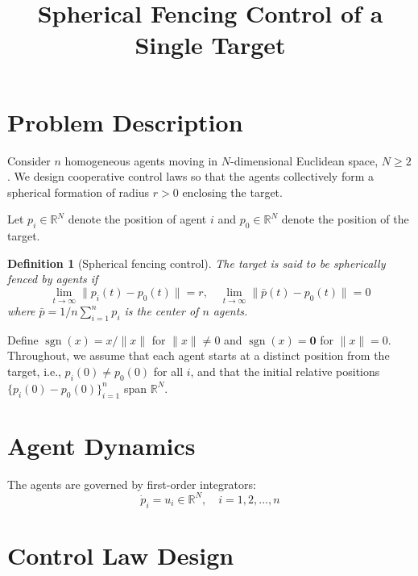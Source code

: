 \documentclass{ctexart}
\title{Spherical Fencing Control of a Single Target}
\DeclareMathOperator{\sgn}{sgn}
\newtheorem{definition}[theorem]{Definition}
\begin{document}
\maketitle

\section{Problem Description}

Consider $n$ homogeneous agents moving in $N$-dimensional Euclidean space, $N \geq 2$.
We design cooperative control laws so that the agents collectively form a spherical formation of radius $r > 0$ enclosing the target.

Let $p_i \in \mathbb{R}^N$ denote the position of agent $i$ and $p_0 \in \mathbb{R}^N$ denote the position of the target.
\begin{definition}[Spherical fencing control]
The target is said to \textit{be spherically fenced} by agents if
\begin{equation}
\lim_{t \to \infty} \|p_i(t) - p_0(t)\| = r ,
\quad 
\lim_{t \to \infty} \|\bar{p}(t) - p_0(t)\| = 0
\end{equation}
where $\bar{p}=1/n \sum_{i=1}^{n} p_i$ is the center of $n$ agents.
\end{definition}

Define $\sgn(x) = x/\|x\|$ for $\|x\| \neq 0$ and $\sgn(x) = \mathbf{0}$ for $\|x\| = 0$.
Throughout, we assume that each agent starts at a distinct position from the target, i.e., $p_i(0) \neq p_0(0)$ for all $i$, and that the initial relative positions $\{p_i(0) - p_0(0)\}_{i=1}^{n}$ span $\mathbb{R}^N$.

\section{Agent Dynamics}

The agents are governed by first-order integrators:
\begin{equation}
\dot{p}_i = u_i \in \mathbb{R}^N, \quad i = 1,2,\dots,n
\label{eq:agent_dyn}
\end{equation}

\section{Control Law Design}
\end{document}
